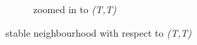 \begin{figure}[H]
\begin{subfigure}{.53\textwidth}
    \caption{zoomed in to \textit{(T,T)}}
    \label{fig:Weak2x2-2b}
\end{subfigure}
\caption{stable neighbourhood with respect to \textit{(T,T)}}
\label{fig:Weak2x2-2}
\end{figure}







